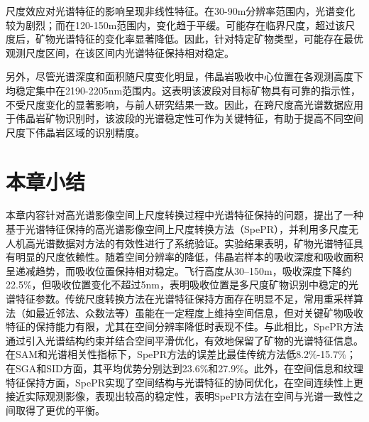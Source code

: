 尺度效应对光谱特征的影响呈现非线性特征。在30-90m分辨率范围内，光谱变化较为剧烈；而在120-150m范围内，变化趋于平缓。可能存在临界尺度，超过该尺度后，矿物光谱特征的变化率显著降低。因此，针对特定矿物类型，可能存在最优观测尺度区间，在该区间内光谱特征保持相对稳定。

另外，尽管光谱深度和面积随尺度变化明显，伟晶岩吸收中心位置在各观测高度下均稳定集中在2190-2205nm范围内。这表明该波段对目标矿物具有可靠的指示性，不受尺度变化的显著影响，与前人研究结果一致\cite{bai2023mapping,booysen2022accurate}。因此，在跨尺度高光谱数据应用于伟晶岩矿物识别时，该波段的光谱稳定性可作为关键特征，有助于提高不同空间尺度下伟晶岩区域的识别精度。

\section{本章小结}
本章内容针对高光谱影像空间上尺度转换过程中光谱特征保持的问题，提出了一种基于光谱特征保持的高光谱影像空间上尺度转换方法（SpePR），并利用多尺度无人机高光谱数据对方法的有效性进行了系统验证。实验结果表明，矿物光谱特征具有明显的尺度依赖性。随着空间分辨率的降低，伟晶岩样本的吸收深度和吸收面积呈递减趋势，而吸收位置保持相对稳定。飞行高度从30–150m，吸收深度下降约22.5\%，但吸收位置变化不超过5nm，表明吸收位置是多尺度矿物识别中稳定的光谱特征参数。传统尺度转换方法在光谱特征保持方面存在明显不足，常用重采样算法（如最近邻法、众数法等）虽能在一定程度上维持空间信息，但对关键矿物吸收特征的保持能力有限，尤其在空间分辨率降低时表现不佳。与此相比，SpePR方法通过引入光谱结构约束并结合空间平滑优化，有效地保留了矿物的光谱特征信息。在SAM和光谱相关性指标下，SpePR方法的误差比最佳传统方法低8.2\%-15.7\%；在SGA和SID方面，其平均优势分别达到23.6\%和27.9\%。此外，在空间信息和纹理特征保持方面，SpePR实现了空间结构与光谱特征的协同优化，在空间连续性上更接近实际观测影像，表现出较高的稳定性，表明SpePR方法在空间与光谱一致性之间取得了更优的平衡。
